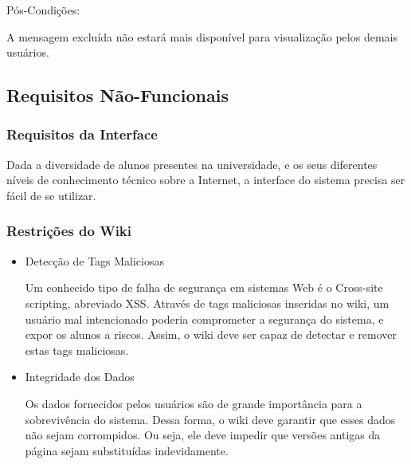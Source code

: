 \documentclass[11pt]{article}
\begin{document}
Pós-Condições:

      A mensagem excluída não estará mais disponível para visualização pelos demais usuários. 



\subsection{Requisitos Não-Funcionais}

\subsubsection{Requisitos da Interface}

Dada a diversidade de alunos presentes na universidade, e os seus diferentes níveis de conhecimento técnico sobre a Internet, a interface do sistema precisa ser fácil de se utilizar.

\subsubsection{Restrições do Wiki}
\begin{itemize}
\item Detecção de Tags Maliciosas

Um conhecido tipo de falha de segurança em sistemas Web é o Cross-site scripting, abreviado XSS. Através de tags maliciosas inseridas no wiki, um usuário mal intencionado poderia comprometer a segurança do sistema, e expor os alunos a riscos. Assim, o wiki deve ser capaz de detectar e remover estas tags maliciosas.

\item Integridade dos Dados

Os dados fornecidos pelos usuários são de grande importância para a sobrevivência do sistema. Dessa forma, o wiki deve garantir que esses dados não sejam corrompidos. Ou seja, ele deve impedir que versões antigas da página sejam substituídas indevidamente.  
\end{itemize}
\end{document}
